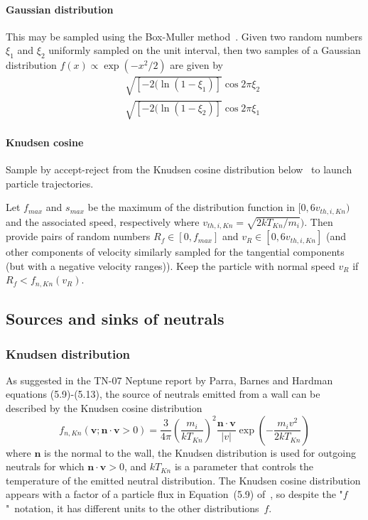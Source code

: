 \paragraph{Gaussian distribution}\label{sec:specdistgaussian}
This may be sampled using the Box-Muller method~\cite[\S\,3.1]{kaloswhitlock}.
Given two random numbers $\xi_1$ and $\xi_2$ uniformly sampled on the unit
interval, then two samples of a Gaussian distribution $f(x) \propto \exp(-x^2/2)$
are given by
\begin{eqnarray}\label{eq:gaussamp}
&&\sqrt{[-2(\ln(1-\xi_1)]} \cos 2\pi \xi_2 \\
&&\sqrt{[-2(\ln(1-\xi_2)]} \cos 2\pi \xi_1
\end{eqnarray}

\paragraph{Knudsen cosine}\label{sec:specdistknud}
Sample by accept-reject from the Knudsen cosine distribution below~ to launch
particle trajectories.

Let $f_{max}$ and $s_{max}$ be the maximum of the distribution function
in $[0,6v_{th,i,Kn})$ and the associated speed, respectively
where $v_{th,i,Kn}=\sqrt{2kT_{Kn}/m_{i}})$. Then provide
pairs of random numbers $R_{f}\in[0,f_{max}]$ and $v_{R}\in[0,6v_{th,i,Kn}]$
(and other components of velocity similarly sampled for the tangential
components (but with a negative velocity ranges)). Keep the particle
with normal speed $v_{R}$ if $R_{f}<f_{n,Kn}(v_{R})$.

\subsection{Sources and sinks of neutrals}\label{sec:31sources}
\subsubsection{Knudsen distribution}\label{sec:Knudsen}
As suggested in the TN-07 Neptune report by Parra, Barnes and Hardman~\cite{2047357-TN-07}
equations (5.9)-(5.13), the source of neutrals emitted from a wall
can be described by the Knudsen cosine distribution
\begin{equation}\label{eq:distknud}
f_{n,Kn}\left(\boldsymbol{v};\boldsymbol{n}\cdot\boldsymbol{v}>0\right)=\frac{3}{4\pi}\left(\frac{m_{i}}{kT_{Kn}}\right)^{2}\frac{\boldsymbol{n}\cdot\boldsymbol{v}}{\left|v\right|}\exp\left(-\frac{m_{i}v^{2}}{2kT_{Kn}}\right)
\end{equation}
where $\boldsymbol{n}$ is the normal to the wall, the Knudsen distribution
is used for outgoing neutrals for which $\boldsymbol{n}\cdot\boldsymbol{v}>0$,
and $kT_{Kn}$ is a parameter that controls the temperature
of the emitted neutral distribution. The Knudsen cosine distribution appears with a factor of
a particle flux in Equation~(5.9) of~\cite{2047357-TN-07}, so
despite the "$f$"~notation, it has different units to the other distributions~$f$.

